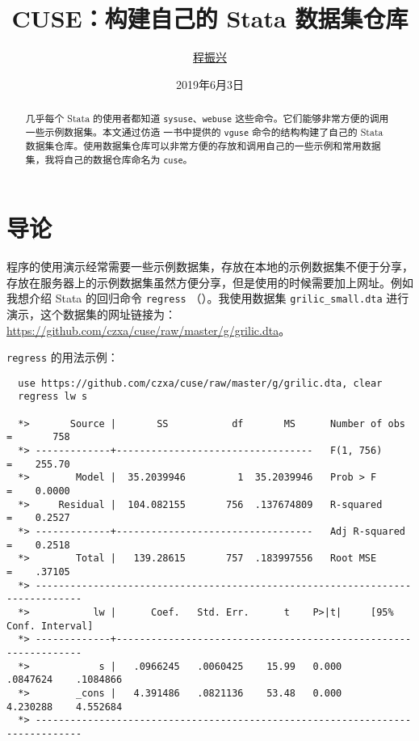 \documentclass[lang=cn,11pt]{elegantpaper}
\title{CUSE：构建自己的 Stata 数据集仓库}
\author{\href{https://www.czxa.top}{程振兴}}
\date{2019年6月3日}
\begin{document}
\maketitle

\begin{abstract}
\noindent 几乎每个 Stata 的使用者都知道 \lstinline{sysuse}、\lstinline{webuse} 这些命令。它们能够非常方便的调用一些示例数据集。本文通过仿造 \cite{Mitchell2006A} 一书中提供的 \lstinline{vguse} 命令的结构构建了自己的 Stata 数据集仓库。使用数据集仓库可以非常方便的存放和调用自己的一些示例和常用数据集，我将自己的数据仓库命名为 \lstinline{cuse}。
\end{abstract}

\section{导论}

程序的使用演示经常需要一些示例数据集，存放在本地的示例数据集不便于分享，存放在服务器上的示例数据集虽然方便分享，但是使用的时候需要加上网址。例如我想介绍 Stata 的回归命令 \lstinline{regress} （）。我使用数据集 \lstinline{grilic_small.dta} 进行演示，这个数据集的网址链接为：\url{https://github.com/czxa/cuse/raw/master/g/grilic.dta}。

\lstinline{regress} 的用法示例：

\begin{lstlisting}
  use https://github.com/czxa/cuse/raw/master/g/grilic.dta, clear
  regress lw s

  *>       Source |       SS           df       MS      Number of obs   =       758
  *> -------------+----------------------------------   F(1, 756)       =    255.70
  *>        Model |  35.2039946         1  35.2039946   Prob > F        =    0.0000
  *>     Residual |  104.082155       756  .137674809   R-squared       =    0.2527
  *> -------------+----------------------------------   Adj R-squared   =    0.2518
  *>        Total |   139.28615       757  .183997556   Root MSE        =    .37105
  *> ------------------------------------------------------------------------------
  *>           lw |      Coef.   Std. Err.      t    P>|t|     [95% Conf. Interval]
  *> -------------+----------------------------------------------------------------
  *>            s |   .0966245   .0060425    15.99   0.000     .0847624    .1084866
  *>        _cons |   4.391486   .0821136    53.48   0.000     4.230288    4.552684
  *> ------------------------------------------------------------------------------
\end{lstlisting}
\end{document}
